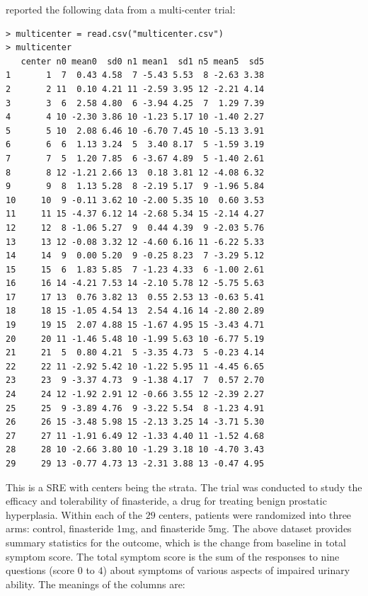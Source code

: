 \begin{HomeworkProblem}\label{exr:5-8}

\citet[][Table 1]{gould1998multi} reported the following data from a multi-center trial:

\begin{lstlisting}
> multicenter = read.csv("multicenter.csv")
> multicenter
   center n0 mean0  sd0 n1 mean1  sd1 n5 mean5  sd5
1       1  7  0.43 4.58  7 -5.43 5.53  8 -2.63 3.38
2       2 11  0.10 4.21 11 -2.59 3.95 12 -2.21 4.14
3       3  6  2.58 4.80  6 -3.94 4.25  7  1.29 7.39
4       4 10 -2.30 3.86 10 -1.23 5.17 10 -1.40 2.27
5       5 10  2.08 6.46 10 -6.70 7.45 10 -5.13 3.91
6       6  6  1.13 3.24  5  3.40 8.17  5 -1.59 3.19
7       7  5  1.20 7.85  6 -3.67 4.89  5 -1.40 2.61
8       8 12 -1.21 2.66 13  0.18 3.81 12 -4.08 6.32
9       9  8  1.13 5.28  8 -2.19 5.17  9 -1.96 5.84
10     10  9 -0.11 3.62 10 -2.00 5.35 10  0.60 3.53
11     11 15 -4.37 6.12 14 -2.68 5.34 15 -2.14 4.27
12     12  8 -1.06 5.27  9  0.44 4.39  9 -2.03 5.76
13     13 12 -0.08 3.32 12 -4.60 6.16 11 -6.22 5.33
14     14  9  0.00 5.20  9 -0.25 8.23  7 -3.29 5.12
15     15  6  1.83 5.85  7 -1.23 4.33  6 -1.00 2.61
16     16 14 -4.21 7.53 14 -2.10 5.78 12 -5.75 5.63
17     17 13  0.76 3.82 13  0.55 2.53 13 -0.63 5.41
18     18 15 -1.05 4.54 13  2.54 4.16 14 -2.80 2.89
19     19 15  2.07 4.88 15 -1.67 4.95 15 -3.43 4.71
20     20 11 -1.46 5.48 10 -1.99 5.63 10 -6.77 5.19
21     21  5  0.80 4.21  5 -3.35 4.73  5 -0.23 4.14
22     22 11 -2.92 5.42 10 -1.22 5.95 11 -4.45 6.65
23     23  9 -3.37 4.73  9 -1.38 4.17  7  0.57 2.70
24     24 12 -1.92 2.91 12 -0.66 3.55 12 -2.39 2.27
25     25  9 -3.89 4.76  9 -3.22 5.54  8 -1.23 4.91
26     26 15 -3.48 5.98 15 -2.13 3.25 14 -3.71 5.30
27     27 11 -1.91 6.49 12 -1.33 4.40 11 -1.52 4.68
28     28 10 -2.66 3.80 10 -1.29 3.18 10 -4.70 3.43
29     29 13 -0.77 4.73 13 -2.31 3.88 13 -0.47 4.95
\end{lstlisting}


This is a SRE with centers being the strata.
The trial was conducted to study the efficacy and tolerability of finasteride, a drug for treating benign prostatic hyperplasia.
Within each of the $29$ centers, patients were randomized into three arms: control, finasteride 1mg, and finasteride 5mg. The above dataset
provides summary statistics for the outcome, which is the change from baseline in total symptom score. The total symptom score is the sum of the responses to nine questions (score $0$ to $4$) about symptoms of various aspects of impaired urinary ability. The meanings of the columns are:


\end{HomeworkProblem}
